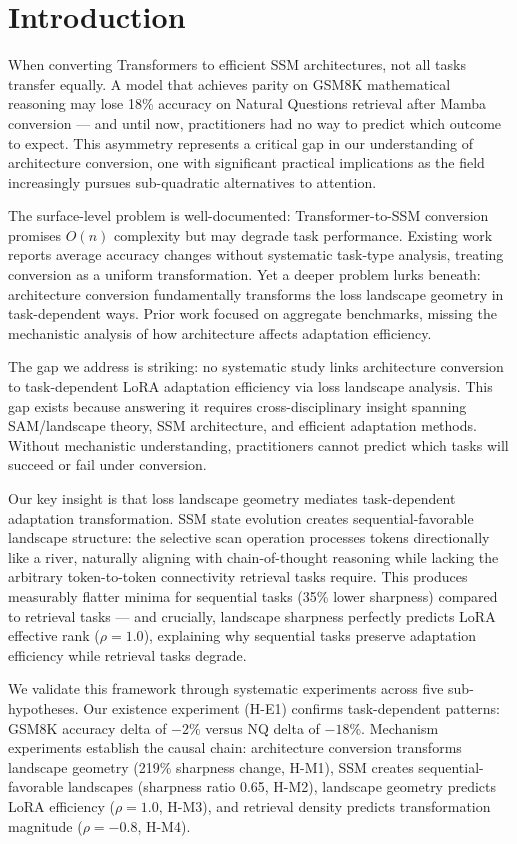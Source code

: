 \section{Introduction}

When converting Transformers to efficient SSM architectures, not all tasks transfer equally. A model that achieves parity on GSM8K mathematical reasoning may lose 18\% accuracy on Natural Questions retrieval after Mamba conversion --- and until now, practitioners had no way to predict which outcome to expect. This asymmetry represents a critical gap in our understanding of architecture conversion, one with significant practical implications as the field increasingly pursues sub-quadratic alternatives to attention.

The surface-level problem is well-documented: Transformer-to-SSM conversion promises $O(n)$ complexity but may degrade task performance. Existing work reports average accuracy changes without systematic task-type analysis, treating conversion as a uniform transformation. Yet a deeper problem lurks beneath: architecture conversion fundamentally transforms the loss landscape geometry in task-dependent ways. Prior work focused on aggregate benchmarks, missing the mechanistic analysis of how architecture affects adaptation efficiency.

The gap we address is striking: no systematic study links architecture conversion to task-dependent LoRA adaptation efficiency via loss landscape analysis. This gap exists because answering it requires cross-disciplinary insight spanning SAM/landscape theory, SSM architecture, and efficient adaptation methods. Without mechanistic understanding, practitioners cannot predict which tasks will succeed or fail under conversion.

Our key insight is that loss landscape geometry mediates task-dependent adaptation transformation. SSM state evolution creates sequential-favorable landscape structure: the selective scan operation processes tokens directionally like a river, naturally aligning with chain-of-thought reasoning while lacking the arbitrary token-to-token connectivity retrieval tasks require. This produces measurably flatter minima for sequential tasks (35\% lower sharpness) compared to retrieval tasks --- and crucially, landscape sharpness perfectly predicts LoRA effective rank ($\rho=1.0$), explaining why sequential tasks preserve adaptation efficiency while retrieval tasks degrade.

We validate this framework through systematic experiments across five sub-hypotheses. Our existence experiment (H-E1) confirms task-dependent patterns: GSM8K accuracy delta of $-2\%$ versus NQ delta of $-18\%$. Mechanism experiments establish the causal chain: architecture conversion transforms landscape geometry (219\% sharpness change, H-M1), SSM creates sequential-favorable landscapes (sharpness ratio 0.65, H-M2), landscape geometry predicts LoRA efficiency ($\rho=1.0$, H-M3), and retrieval density predicts transformation magnitude ($\rho=-0.8$, H-M4).

